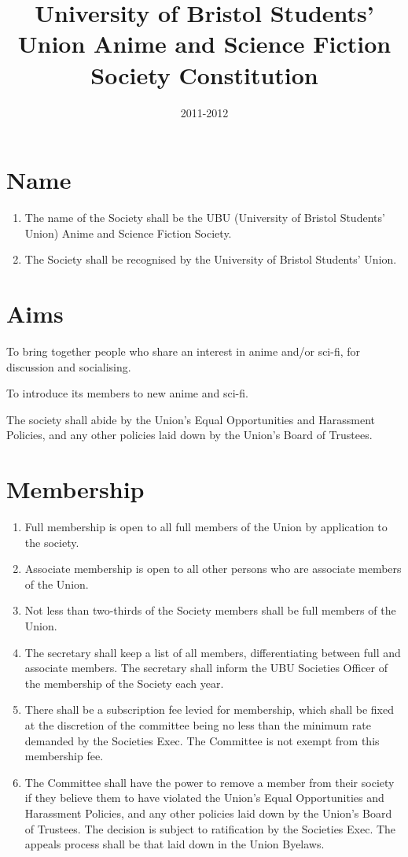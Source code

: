 \documentclass[a4paper,10pt]{article}
\title{University of Bristol Students’ Union Anime and Science Fiction Society Constitution}
\date{2011-2012}
\begin{document}
\maketitle

\section{Name}
\begin{enumerate}
  \item The name of the Society shall be the UBU (University of Bristol Students’ Union) Anime and Science Fiction Society.
  \item The Society shall be recognised by the University of Bristol Students’ Union.
\end{enumerate}

\section{Aims}
To bring together people who share an interest in anime and/or sci-fi, for discussion and socialising.

To introduce its members to new anime and sci-fi.

The society shall abide by the Union’s Equal Opportunities and Harassment Policies, and any other policies laid down by the Union’s Board of Trustees.

\section{Membership}
\begin{enumerate}
  \item Full membership is open to all full members of the Union by application to the society.
  \item Associate membership is open to all other persons who are associate members of the Union.
  \item Not less than two-thirds of the Society members shall be full members of the Union.
  \item The secretary shall keep a list of all members, differentiating between full and associate members. The secretary shall inform the UBU Societies Officer of the membership of the Society each year.
  \item There shall be a subscription fee levied for membership, which shall be fixed at the discretion of the committee being no less than the minimum rate demanded by the Societies Exec. The Committee is not exempt from this membership fee.
  \item The Committee shall have the power to remove a member from their society if they believe them to have violated the Union’s Equal Opportunities and Harassment Policies, and any other policies laid down by the Union’s Board of Trustees. The decision is subject to ratification by the Societies Exec. The appeals process shall be that laid down in the Union Byelaws.
\end{enumerate}
\end{document}
